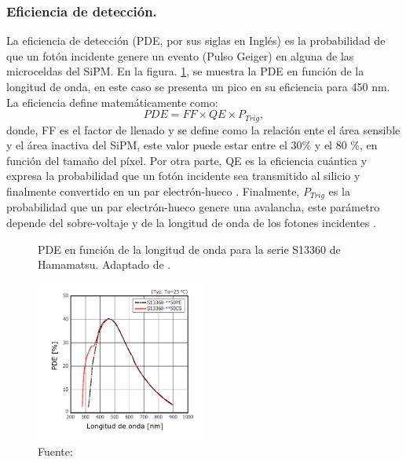 \subsubsection{Eficiencia de detección.}
La eficiencia de detección (PDE, por sus siglas en Inglés) es la probabilidad de que un fotón incidente genere un evento (Pulso Geiger) en alguna de las microceldas del SiPM. En la figura. \ref{fig:PDE}, se muestra la PDE en función de la longitud de onda, en este caso se presenta un pico en su eficiencia para 450 nm. La eficiencia define matemáticamente como:
\begin{equation}
    PDE= FF\times QE \times P_{Trig},
\end{equation}
donde, FF es el factor de llenado y  se define como la relación ente el área sensible y el área inactiva del SiPM, este valor puede  estar entre el 30\% y el 80 \%, en función del tamaño del píxel. Por otra parte, QE es la eficiencia cuántica y expresa la probabilidad que un fotón incidente sea transmitido al silicio y finalmente convertido en un par electrón-hueco \citep{Study_SiPM}. Finalmente, $P_{Trig}$ es la probabilidad que un par electrón-hueco genere una avalancha, este parámetro depende del sobre-voltaje y de la longitud de onda de los fotones incidentes \citep{Study_SiPM_FBK}.\\

\begin{figure}[h!]
\begin{centering}
    \caption{PDE en función de la longitud de onda para la serie S13360 de Hamamatsu. Adaptado de \citep{Sipm_S13360_1350CS_datasheet}.}
    \includegraphics[width=0.5\textwidth]{Images/PDE.PNG}
    \caption*{Fuente:}
    \label{fig:PDE}  
  \par\end{centering}
\end{figure}

